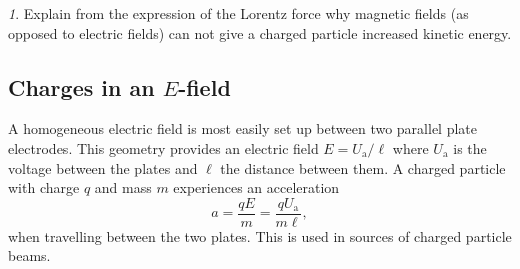 \documentclass[../Elmag-labhefte-2020.tex]{subfiles}
\begin{document}
{\emph 1. Explain from the expression of the Lorentz force why magnetic fields (as opposed to electric fields) can not give a charged particle increased kinetic energy.}

\subsection{Charges in an $E$-field}

A homogeneous electric field is most easily set up between two parallel plate electrodes. This geometry provides an electric field $E = U_\mathrm{a}/\ell$ where $U_\mathrm{a}$ is the voltage between the plates and $\ell$ the distance between them.
A charged particle with charge $q$ and mass $m$ experiences an acceleration
\begin{equation}
    a = \frac{q E}{m} = \frac{q U_\mathrm{a}}{m\ell},
    \label{eq:lorentz.aksel}
\end{equation}
when travelling between the two plates.
This is used in sources of charged particle beams.
\end{document}
